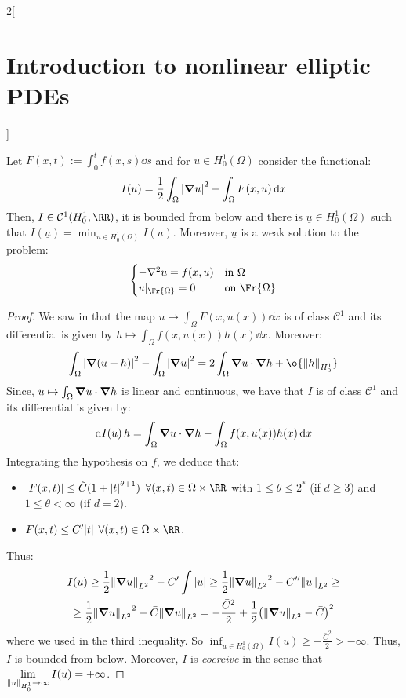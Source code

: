 \documentclass[../../../main_math.tex]{subfiles}
\begin{document}
\begin{multicols}{2}[\section{Introduction to nonlinear elliptic PDEs}]
\begin{theorem}
    Let $F(x,t):=\int_0^tf(x,s)\dd{s}$ and for $u\in H_0^1(\Omega)$ consider the functional:
    $$
      I(u)=\frac{1}{2}\int_\Omega \abs{\grad u}^2-\int_\Omega F(x,u)\dd{x}
    $$
    Then, $I\in\mathcal{C}^1(H_0^1,\RR)$, it is bounded from below and there is $\underline{u}\in H_0^1(\Omega)$ such that $\displaystyle I(\underline{u})=\min_{u\in H_0^1(\Omega)}I(u)$. Moreover, $\underline{u}$ is a weak solution to the problem:
    \begin{equation}
      \label{INEPDE:eq_problem_min}
      \begin{cases}
        -\laplacian u=f(x,u) & \text{in }\Omega      \\
        u|_{\Fr{\Omega}}=0   & \text{on }\Fr{\Omega}
      \end{cases}
    \end{equation}
  \end{theorem}
  \begin{proof}
    We saw in  that the map $u\mapsto \int_\Omega F(x,u(x))\dd{x}$ is of class $\mathcal{C}^1$ and its differential is given by $h\mapsto \int_\Omega f(x,u(x))h(x)\dd{x}$. Moreover:
    $$
      \int_\Omega\abs{\grad(u+h)}^2-\int_\Omega\abs{\grad u}^2=2\int_\Omega \grad u\cdot \grad h+\o{\norm{h}_{H_0^1}}
    $$
    Since, $u\mapsto \int_\Omega \grad u\cdot \grad h$ is linear and continuous, we have that $I$ is of class $\mathcal{C}^1$ and its differential is given by:
    $$
      \dd{I(u)}h=\int_\Omega \grad u\cdot \grad h-\int_\Omega f(x,u(x))h(x)\dd{x}
    $$
    Integrating the hypothesis on $f$, we deduce that:
    \begin{itemize}
      \item $\abs{F(x,t)}\leq \tilde{C} (1+\abs{t}^{\theta+1})$ $\forall (x,t)\in \Omega\times \RR$ with $1\leq \theta\leq 2^*$ (if $d\geq 3$) and $1\leq \theta<\infty$ (if $d=2$).
      \item $F(x,t)\leq C'\abs{t}$ $\forall (x,t)\in \Omega\times \RR$.
    \end{itemize}
    Thus:
    \begin{multline*}
      I(u)\geq \frac{1}{2}{\norm{\grad u}_{L^2}}^2-C'\int \abs{u}\geq \frac{1}{2}{\norm{\grad u}_{L^2}}^2-C''{\norm{u}_{L^2}}\geq \\\geq \frac{1}{2} {\norm{\grad u}_{L^2}}^2-\bar{C}{\norm{\grad u}_{L^2}}
      =-\frac{\bar{C}^2}{2}+\frac{1}{2}{\left(\norm{\grad u}_{L^2}-\bar{C}\right)}^2
    \end{multline*}
    where we used  in the third inequality. So $\displaystyle \inf_{u\in H_0^1(\Omega)}I(u)\geq -\frac{\bar{C}^2}{2}>-\infty$. Thus, $I$ is bounded from below. Moreover, $I$ is \emph{coercive} in the sense that $\displaystyle \lim_{\norm{u}_{H_0^1}\to\infty}I(u)=+\infty$.


\end{proof}
\end{multicols}
\end{document}
